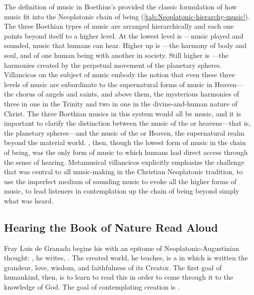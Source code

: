 The definition of music in Boethius's  provided the classic
formulation of how music fit into the Neoplatonic chain of being
(\cref{tab:Neoplatonic-hierarchy-music}).
The three Boethian types of music are arranged hierarchically and each one
points beyond itself to a higher level.
At the lowest level is ---music played and sounded,
music that humans can hear.
Higher up is ---the harmony of body and soul, and of one
human being with another in society.
Still higher is ---the harmonies created by the perpetual
movement of the planetary spheres.
Villancicos on the subject of music embody the notion that even these three
levels of music are subordinate to the supernatural forms of music in
Heaven---the chorus of angels and saints, and above them, the mysterious
harmonies of three in one in the Trinity and two in one in the divine-and-human
nature of Christ.
The three Boethian musics in this system would all be  music,
and it is important to clarify the distinction between the music of the
 or heavens---that is, the planetary spheres---and the
 music of the  or Heaven, the
supernatural realm beyond the material world.
, then, though the lowest form of music in the
chain of being, was the only form of music to which humans had direct access
through the sense of hearing.
Metamusical villancicos explicitly emphasize the challenge that was central to
all music-making in the Christian Neoplatonic tradition, to use the imperfect
medium of sounding music to evoke all the higher forms of music, to lead
listeners in contemplation up the chain of being beyond simply what was heard.


\subsection{Hearing the Book of Nature Read Aloud}

Fray Luis de Granada begins his  with an
epitome of Neoplatonic-Augustinian thought: , he writes, .%
    \Autocite[182]{LuisdeGranada:Simbolo}
The created world, he teaches, is a  in which is written
the grandeur, love, wisdom, and faithfulness of its Creator.
The first goal of humankind, then, is to learn to read this  in order to come through it to the knowledge of God. 
The goal of contemplating creation is .%
    \Autocite[184]{LuisdeGranada:Simbolo}

